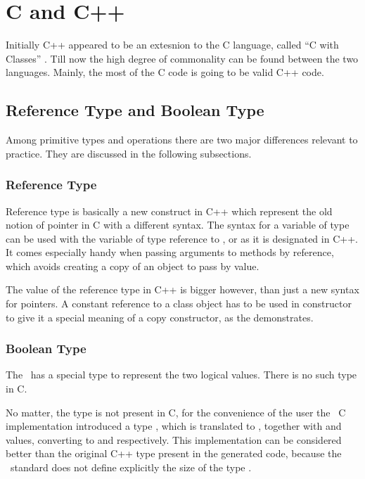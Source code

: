 \chapter{C and C++}

Initially C++ appeared to be an extesnion to the C language, called ``C with Classes'' \cite{cwithclasses}. Till now the high degree
of commonality can be found between the two languages. Mainly, the most of the C code is going to be valid C++ code. 

\section{Reference Type and Boolean Type}

Among primitive types and operations there are two major differences relevant to practice.
They are discussed in the following subsections.

\subsection{Reference Type}

Reference type is basically a new construct in C++ which represent the old notion of pointer in C with a different syntax.
The syntax for a variable of type  can be used with the variable of type reference to , or  as it is designated in C++.
It comes especially handy when passing arguments to methods by reference, which avoids creating a copy of an object to pass 
by value.

The value of the reference type in C++ is bigger however, than just a new syntax for pointers. A constant reference to a class object 
has to be used in constructor to give it a special meaning of a copy constructor, as the  demonstrates.


\subsection{Boolean Type}

The \cpppl\ has a special  type to represent the two logical values. There is no such type in C.

No matter, the  type is not present in C, for the convenience of the user the \mb\ C implementation introduced a type ,
which is translated to , together with  and  values, converting to  and  respectively.
This implementation can be considered better than the original C++  type present in the generated code, because the \cpppl\ standard
does not define explicitly the size of the  type \cite{cpp11}.

